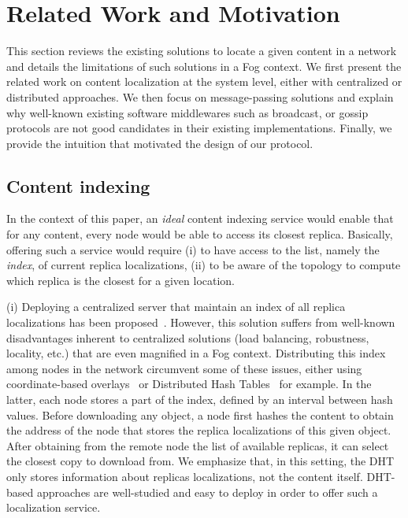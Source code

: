 
\section{Related Work and Motivation}
\label{sec:background}

This section reviews the existing solutions to locate a given content in a network and details the limitations 
of such solutions in a Fog context. 
We first present the related work on content localization at the system level, either with centralized or distributed approaches. 
We then focus on message-passing solutions and explain why well-known existing software middlewares such as broadcast, or gossip protocols are not good candidates in their existing implementations. 
Finally, we provide the intuition that motivated the design of our protocol.

\subsection*{Content indexing}
In the context of this paper, an \textit{ideal} content indexing service would enable that for any content, every node would be able to access its closest replica.
Basically, offering such a service would require (i) to have access to the list, namely the \textit{index}, of current replica localizations, (ii) to be aware of the topology to compute which replica is the closest for a given location.


(i) Deploying a centralized server that maintain an index of all replica localizations has been proposed~\cite{fogstore, p2p-alto, p2p-oracle, snamp}. However, this solution suffers from well-known disadvantages inherent to centralized solutions (load balancing, robustness, locality, etc.) that are even magnified in a Fog context.
Distributing this index among nodes in the network circumvent some of these issues, either using coordinate-based overlays~\cite{coin_19, voronet} or Distributed Hash Tables~\cite{squirrel, ipfs, dht-name-resolution, mdht} for example. In the latter, each node stores a part of the index, defined by an interval between hash values. 
Before downloading any object, a node first
hashes the content to obtain the address of the node that stores the replica localizations of this given object. After obtaining from the remote node the list of available replicas, it can select the closest copy to download from. We emphasize that, in this setting, the DHT only stores information about replicas localizations, not the content itself. DHT-based approaches are well-studied and easy to deploy in order to offer such a localization service. 


